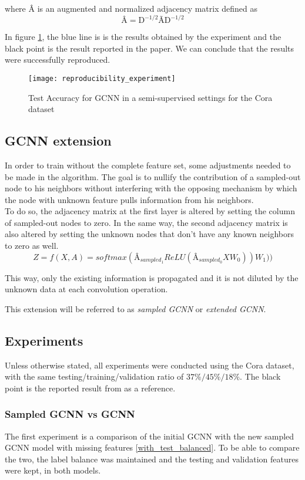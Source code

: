 \documentclass{article}
\begin{document}
where \^{A} is an augmented and normalized adjacency matrix defined as
\begin{equation}
\text{\^{A}} = \text{\~{D}}^{-1/2}\text{\~{A}}\text{\~{D}}^{-1/2}
\end{equation}

In figure \ref{repro}, the blue line is is the results obtained by the experiment and the black point is the result reported in the paper. We can conclude that the results were successfully reproduced.

\begin{figure}[h]
\centering
\texttt{[image: reproducibility\_experiment]}
\caption{Test Accuracy for GCNN in a semi-supervised settings for the Cora dataset}
\label{repro}
\end{figure}
\subsection*{GCNN extension}
In order to train without the complete feature set, some adjustments needed to be made in the algorithm. The goal is to nullify the contribution of a sampled-out node to his neighbors without interfering with the opposing mechanism by which the node with unknown feature pulls information from his neighbors.
\\
To do so, the adjacency matrix at the first layer is altered by setting the column of sampled-out nodes to zero. In the same way, the second adjacency matrix is also altered by setting the unknown nodes that don't have any known neighbors to zero as well.
\begin{equation}
Z = f(X, A) = softmax(\text{\^{A}}_{sampled_1} ReLU(\text{\^{A}}_{sampled_0}XW_0))W_1))
\end{equation}

This way, only the existing information is propagated and it is not diluted by the unknown data at each convolution operation.

This extension will be referred to as \textit{sampled GCNN} or \textit{extended GCNN}.
\subsection*{Experiments}
Unless otherwise stated, all experiments were conducted using the Cora dataset, with the same testing/training/validation ratio of $37\%/45\%/18\%$. The black point is the reported result from \citeauthor{kipf2017semi} as a reference.
\subsubsection*{Sampled GCNN vs GCNN}
The first experiment is a comparison of the initial GCNN with the new sampled GCNN model with missing features \ref{with_test_balanced}.
 To be able to compare the two, the label balance was maintained and the testing and validation features were kept, in both models.
\end{document}
